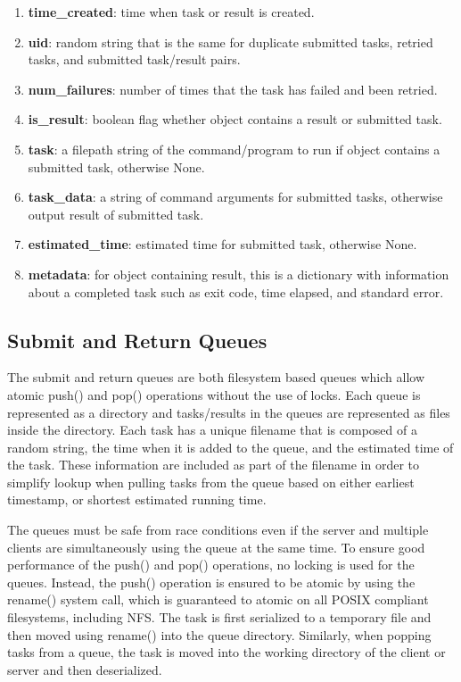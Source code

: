 \documentclass{article}
\begin{document}
\begin{enumerate}
\item \textbf{time\_created}: time when task or result is created.
\item \textbf{uid}: random string that is the same for duplicate submitted tasks, retried tasks, and submitted task/result pairs.
\item \textbf{num\_failures}: number of times that the task has failed and been retried.
\item \textbf{is\_result}: boolean flag whether object contains a result or submitted task.
\item \textbf{task}: a filepath string of the command/program to run if object contains a submitted task, otherwise None.
\item \textbf{task\_data}: a string of command arguments for submitted tasks, otherwise output result of submitted task.
\item \textbf{estimated\_time}: estimated time for submitted task, otherwise None.
\item \textbf{metadata}: for object containing result, this is a dictionary with information about a completed task such as exit code, time elapsed, and standard error.
\end{enumerate}

\subsection{Submit and Return Queues}

The submit and return queues are both filesystem based queues which allow atomic push() and pop() operations without the use of locks. Each queue is represented as a directory and tasks/results in the queues are represented as files inside the directory. Each task has a unique filename that is composed of a random string, the time when it is added to the queue, and the estimated time of the task. These information are included as part of the filename in order to simplify lookup when pulling tasks from the queue based on either earliest timestamp, or shortest estimated running time.

The queues must be safe from race conditions even if the server and multiple clients are simultaneously using the queue at the same time. To ensure good performance of the push() and pop() operations, no locking is used for the queues. Instead, the push() operation is ensured to be atomic by using the rename() system call, which is guaranteed to atomic on all POSIX compliant filesystems, including NFS. The task is first serialized to a temporary file and then moved using rename() into the queue directory. Similarly, when popping tasks from a queue, the task is moved into the working directory of the client or server and then deserialized.
\end{document}
